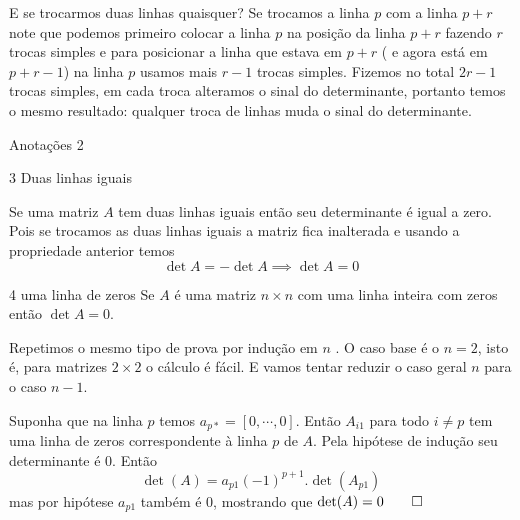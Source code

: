 \documentclass{beamer}
\begin{document}
\begin{frame}{E se trocarmos duas linhas quaisquer?}
  Se trocamos a linha $p$ com a linha $p+r$ note que podemos primeiro colocar
  a linha $p$ na posição da linha $p+r$ fazendo $r$
  trocas simples e para posicionar a linha que estava em 
  $p+r$ ( e agora está em $p+r-1$) na linha $p$ usamos 
  mais $r-1$ trocas simples. Fizemos no total $2r-1$ trocas 
  simples, em cada troca alteramos o sinal do determinante,
  portanto temos o mesmo resultado: qualquer troca de linhas muda o sinal do 
  determinante.
\end{frame}

\begin{frame}{Anotações 2}
  
\end{frame}

\begin{frame}{3 Duas linhas iguais}

  Se uma matriz $A$ tem duas linhas iguais então seu 
  determinante é igual a zero.
  Pois se trocamos as duas linhas iguais a matriz fica
  inalterada e usando a propriedade anterior temos
  $$ \det{A}=-\det{A} \implies \det{A}=0 $$
\end{frame}

\begin{frame}{4 uma linha de zeros}
  Se $A$ é uma matriz $n\times n$ com uma linha inteira 
  com zeros então $\det{A} =0$.

  Repetimos o mesmo tipo de prova por indução em $n$ . O caso base é o $n=2$,
  isto é, para matrizes $2\times 2$ o cálculo é fácil. E vamos tentar reduzir o
  caso geral $n$ para o caso $n-1$.
  
  Suponha que na linha $p$ temos $a_{p*} = [0, \cdots, 0]$. Então $A_{i1}$ para todo $i\neq p$ tem uma linha
  de zeros correspondente à linha $p$ de $A$. Pela hipótese de indução seu determinante é $0$. Então 
  $$\det(A) = a_{p1}(-1)^{p+1}.\det(A_{p1})$$
  mas por hipótese $a_{p1}$ também é $0$, mostrando que $\det(A)=0 \qed$
\end{frame}
\end{document}
